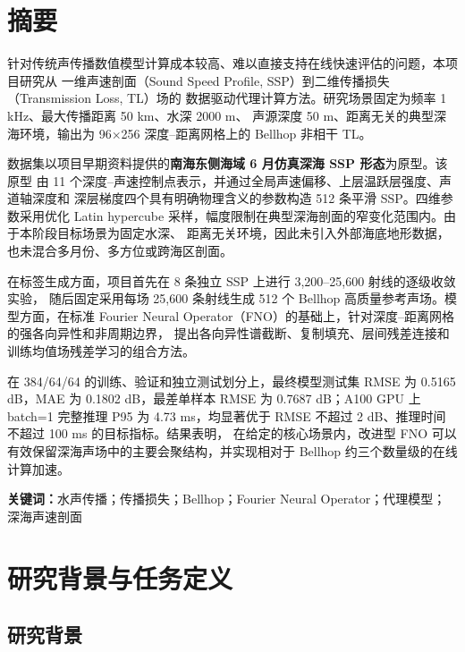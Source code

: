 \documentclass[UTF8,11pt]{ctexart}
\begin{document}
\section*{摘\quad 要}

针对传统声传播数值模型计算成本较高、难以直接支持在线快速评估的问题，本项目研究从
一维声速剖面（Sound Speed Profile, SSP）到二维传播损失（Transmission Loss, TL）场的
数据驱动代理计算方法。研究场景固定为频率 1 kHz、最大传播距离 50 km、水深 2000 m、
声源深度 50 m、距离无关的典型深海环境，输出为 96$\times$256 深度--距离网格上的
Bellhop 非相干 TL。

数据集以项目早期资料提供的\textbf{南海东侧海域 6 月仿真深海 SSP 形态}为原型。该原型
由 11 个深度--声速控制点表示，并通过全局声速偏移、上层温跃层强度、声道轴深度和
深层梯度四个具有明确物理含义的参数构造 512 条平滑 SSP。四维参数采用优化 Latin
hypercube 采样，幅度限制在典型深海剖面的窄变化范围内。由于本阶段目标场景为固定水深、
距离无关环境，因此未引入外部海底地形数据，也未混合多月份、多方位或跨海区剖面。

在标签生成方面，项目首先在 8 条独立 SSP 上进行 3,200--25,600 射线的逐级收敛实验，
随后固定采用每场 25,600 条射线生成 512 个 Bellhop 高质量参考声场。模型方面，在标准
Fourier Neural Operator（FNO）的基础上，针对深度--距离网格的强各向异性和非周期边界，
提出各向异性谱截断、复制填充、层间残差连接和训练均值场残差学习的组合方法。

在 384/64/64 的训练、验证和独立测试划分上，最终模型测试集 RMSE 为 0.5165 dB，MAE
为 0.1802 dB，最差单样本 RMSE 为 0.7687 dB；A100 GPU 上 batch=1 完整推理 P95 为
4.73 ms，均显著优于 RMSE 不超过 2 dB、推理时间不超过 100 ms 的目标指标。结果表明，
在给定的核心场景内，改进型 FNO 可以有效保留深海声场中的主要会聚结构，并实现相对于
Bellhop 约三个数量级的在线计算加速。

\vspace{0.6cm}
\noindent\textbf{关键词：}水声传播；传播损失；Bellhop；Fourier Neural Operator；代理模型；深海声速剖面

\clearpage
\tableofcontents
\clearpage
{}

\section{研究背景与任务定义}

\subsection{研究背景}
\end{document}
